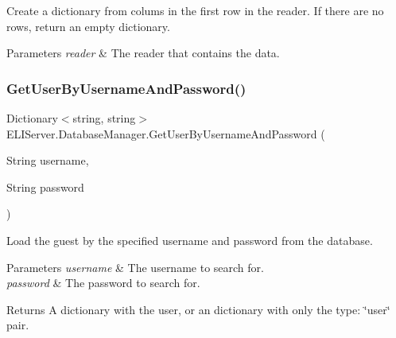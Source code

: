 Create a dictionary from colums in the first row in the reader. If there are no rows, return an empty dictionary. 


\begin{DoxyParams}{Parameters}
{\em reader} & The reader that contains the data.\\
\hline
\end{DoxyParams}
\mbox{\label{class_e_l_i_server_1_1_database_manager_a5eaf0569ca067ab6e074fc76c03439fe}} 
\subsubsection{\texorpdfstring{Get\+User\+By\+Username\+And\+Password()}{GetUserByUsernameAndPassword()}}
{\footnotesize\ttfamily Dictionary$<$string, string$>$ E\+L\+I\+Server.\+Database\+Manager.\+Get\+User\+By\+Username\+And\+Password (\begin{DoxyParamCaption}\item[{String}]{username,  }\item[{String}]{password }\end{DoxyParamCaption})\hspace{0.3cm}{\ttfamily [inline]}}



Load the guest by the specified username and password from the database. 


\begin{DoxyParams}{Parameters}
{\em username} & The username to search for.\\
\hline
{\em password} & The password to search for.\\
\hline
\end{DoxyParams}
\begin{DoxyReturn}{Returns}
A dictionary with the user, or an dictionary with only the type\+: \char`\"{}user\char`\"{} pair.
\end{DoxyReturn}
\mbox{\label{class_e_l_i_server_1_1_database_manager_a8e8315c9b23095cbe799c8f75ccacc87}} 
